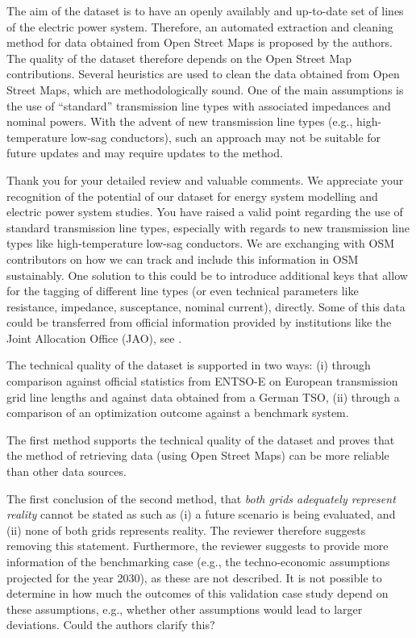 \documentclass{response}
\begin{document}
\RC The aim of the dataset is to have an openly availably and up-to-date set of lines of the electric power system. Therefore, an automated extraction and cleaning method for data obtained from Open Street Maps is proposed by the authors. The quality of the dataset therefore depends on the Open Street Map contributions. Several heuristics are used to clean the data obtained from Open Street Maps, which are methodologically sound. One of the main assumptions is the use of “standard” transmission line types with associated impedances and nominal powers. With the advent of new transmission line types (e.g., high-temperature low-sag conductors), such an approach may not be suitable for future updates and may require updates to the method.

\AR Thank you for your detailed review and valuable comments. We appreciate your recognition of the potential of our dataset for energy system modelling and electric power system studies. You have raised a valid point regarding the use of standard transmission line types, especially with regards to new transmission line types like high-temperature low-sag conductors. We are exchanging with OSM contributors on how we can track and include this information in OSM sustainably. One solution to this could be to introduce additional keys that allow for the tagging of different line types (or even technical parameters like resistance, impedance, susceptance, nominal current), directly. Some of this data could be transferred from official information provided by institutions like the Joint Allocation Office (JAO), see \cite{jaoStaticGridModel2023}.

\RC The technical quality of the dataset is supported in two ways: (i) through comparison against official statistics from ENTSO-E on European transmission grid line lengths and against data obtained from a German TSO, (ii) through a comparison of an optimization outcome against a benchmark system. 

\RC The first method supports the technical quality of the dataset and proves that the method of retrieving data (using Open Street Maps) can be more reliable than other data sources. 

\RC The first conclusion of the second method, that \textit{both grids adequately represent reality} cannot be stated as such as (i) a future scenario is being evaluated, and (ii) none of both grids represents reality. The reviewer therefore suggests removing this statement. Furthermore, the reviewer suggests to provide more information of the benchmarking case (e.g., the techno-economic assumptions projected for the year 2030), as these are not described. It is not possible to determine in how much the outcomes of this validation case study depend on these assumptions, e.g., whether other assumptions would lead to larger deviations. Could the authors clarify this? 
\end{document}
